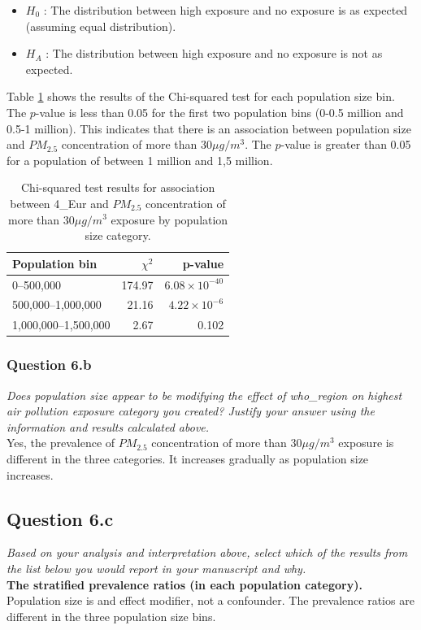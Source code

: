 \begin{itemize}
    \item $H_0$ : The distribution between high exposure and no exposure is as expected (assuming equal distribution).
    \item $H_A$ : The distribution between high exposure and no exposure is not as expected.
\end{itemize}


\noindent Table \ref{tab:chi2_popsize} shows the results of the Chi-squared test for each population size bin. The $p$-value is less than 0.05 for the first two population bins (0-0.5 million and 0.5-1 million). This indicates that there is an association between population size and $PM_{2.5}$ concentration of more than $30 \mu g/m^3 $. The $p$-value is greater than 0.05 for a population of between 1 million and 1,5 million.

\begin{table}[H]
    \centering
    \begin{tabular}{lrr}
        \toprule
        Population bin & $\chi^2$ & p-value \\
        \midrule
        0--500,000 & 174.97 & $6.08 \times 10^{-40}$ \\
        500,000--1,000,000 & 21.16 & $4.22 \times 10^{-6}$ \\
        1,000,000--1,500,000 & 2.67 & 0.102 \\
        \bottomrule
    \end{tabular}
    \caption{Chi-squared test results for association between 4\_Eur and $PM_{2.5}$ concentration of more than $30 \mu g/m^3 $ exposure by population size category.}
    \label{tab:chi2_popsize}
\end{table}


\subsubsection{Question 6.b}
\textit{Does population size appear to be modifying the effect of who\_region
on highest air pollution exposure category you created? Justify your answer using the information and results calculated above.} \\

\noindent Yes, the prevalence of $PM_{2.5}$ concentration of more than $30 \mu g/m^3 $ exposure is different in the three categories. It increases gradually as population size increases.

\subsection{Question 6.c}
\textit{Based on your analysis and interpretation above, select which of the results
from the list below you would report in your manuscript and why.}\\

\noindent \textbf{The stratified prevalence ratios (in each population category).}
Population size is and effect modifier, not a confounder. The prevalence ratios are different in the three population size bins.


\newpage